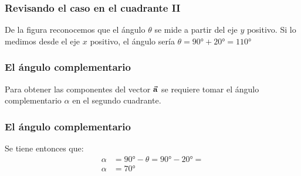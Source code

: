 \documentclass[12pt]{beamer}
\begin{document}
\begin{frame}
\frametitle{Revisando el caso en el cuadrante II}
\begin{minipage}{0.35\linewidth}
\begin{figure}
  \centering
  \end{figure}
\end{minipage}
\begin{minipage}{0.6\linewidth}
De la figura reconocemos que el ángulo $\theta$ se mide a partir del eje $y$ positivo. \pause Si lo medimos desde el eje $x$ positivo, el ángulo sería $\theta = \ang{90} + \ang{20} = \ang{110}$
\end{minipage}
\end{frame}
\begin{frame}
\frametitle{El ángulo complementario}
Para obtener las componentes del vector $\va{a}$ se requiere tomar el ángulo complementario $\alpha$ en el segundo cuadrante.
\end{frame}
\begin{frame}
\frametitle{El ángulo complementario}
\begin{minipage}{0.35\linewidth}
\begin{figure}
  \centering
  \end{figure}
\end{minipage}
\begin{minipage}{0.6\linewidth}
Se tiene entonces que:
\pause
\begin{align*}
\alpha &= \ang{90} - \theta = \ang{90} - \ang{20} = \\[0.5em]
\alpha &= \ang{70}
\end{align*}
\end{minipage}  
\end{frame}
\end{document}
